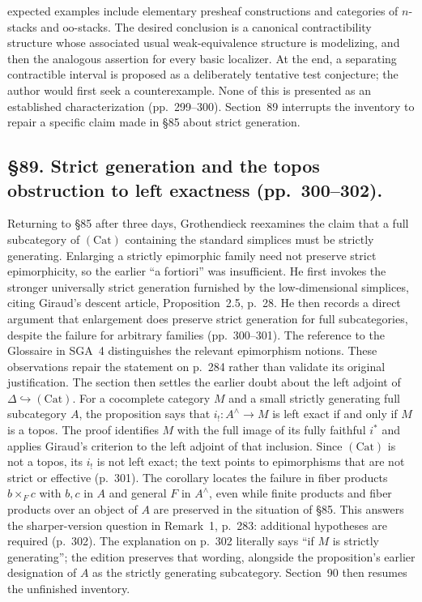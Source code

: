 \documentclass[10pt,oneside]{book}
\begin{document}
expected examples include elementary presheaf constructions and categories of $n$-stacks and $\mathrm{oo}$-stacks. The desired conclusion is a canonical contractibility structure whose associated usual weak-equivalence structure is modelizing, and then the analogous assertion for every basic localizer. At the end, a separating contractible interval is proposed as a deliberately tentative test conjecture; the author would first seek a counterexample. None of this is presented as an established characterization (pp.\ 299--300). Section~89 interrupts the inventory to repair a specific claim made in \S85 about strict generation.

\subsection*{\S89. Strict generation and the topos obstruction to left exactness (pp.\ 300--302).}
Returning to \S85 after three days, Grothendieck reexamines the claim that a full subcategory of $(\mathrm{Cat})$ containing the standard simplices must be strictly generating. Enlarging a strictly epimorphic family need not preserve strict epimorphicity, so the earlier “a fortiori” was insufficient. He first invokes the stronger universally strict generation furnished by the low-dimensional simplices, citing Giraud's descent article, Proposition~2.5, p.\ 28. He then records a direct argument that enlargement does preserve strict generation for full subcategories, despite the failure for arbitrary families (pp.\ 300--301). The reference to the Glossaire in SGA~4 distinguishes the relevant epimorphism notions. These observations repair the statement on p.\ 284 rather than validate its original justification. The section then settles the earlier doubt about the left adjoint of $\Delta\hookrightarrow(\mathrm{Cat})$. For a cocomplete category $M$ and a small strictly generating full subcategory $A$, the proposition says that $i_!:A^\wedge\to M$ is left exact if and only if $M$ is a topos. The proof identifies $M$ with the full image of its fully faithful $i^*$ and applies Giraud's criterion to the left adjoint of that inclusion. Since $(\mathrm{Cat})$ is not a topos, its $i_!$ is not left exact; the text points to epimorphisms that are not strict or effective (p.\ 301). The corollary locates the failure in fiber products $b\times_F c$ with $b,c$ in $A$ and general $F$ in $A^\wedge$, even while finite products and fiber products over an object of $A$ are preserved in the situation of \S85. This answers the sharper-version question in Remark~1, p.\ 283: additional hypotheses are required (p.\ 302). The explanation on p.\ 302 literally says “if $M$ is strictly generating”; the edition preserves that wording, alongside the proposition's earlier designation of $A$ as the strictly generating subcategory. Section~90 then resumes the unfinished inventory.
\end{document}
